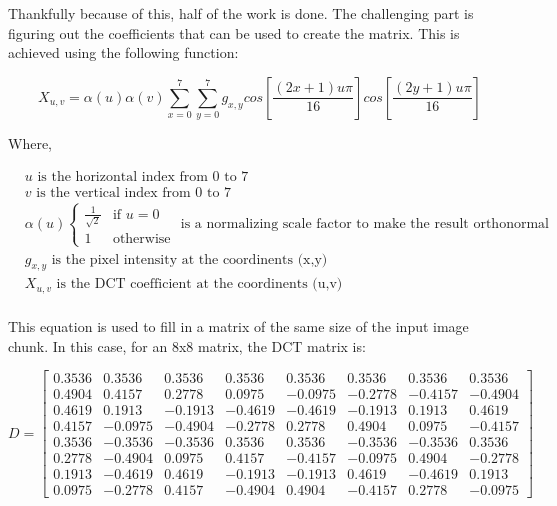 \documentclass[11pt]{article}
\begin{document}
Thankfully because of this, half of the work is done.
The challenging part is figuring out the coefficients that can be used to create the matrix.
This is achieved using the following function:

\begin{equation}
  \label{eqn:dct}
  X_{u,v} = \alpha(u) \alpha(v) \sum_{x=0}^{7} \sum_{y=0}^{7} g_{x,y} cos \left [  \frac{(2x+1)u\pi}{16} \right ] cos \left [  \frac{(2y+1)u\pi}{16} \right ]
\end{equation}

Where,

\begin{align*}
  &u \text{ is the horizontal index from 0 to 7} \\
  &v \text{ is the vertical index from 0 to 7} \\
  &\alpha(u) \left\{\begin{matrix}
    \frac{1}{\sqrt{2}} & \text{if } u=0 \\ 
    1 &  \text{otherwise}
  \end{matrix}\right. \text{ is a normalizing scale factor to make the result orthonormal} \\
  &g_{x,y} \text{ is the pixel intensity at the coordinents (x,y)} \\
  &X_{u,v} \text{ is the DCT coefficient at the coordinents (u,v)} \\
\end{align*}

This equation is used to fill in a matrix of the same size of the input image chunk.
In this case, for an 8x8 matrix, the DCT matrix is:

\begin{equation}
  \label{eqn:dctMatrix}
  D = \begin{bmatrix}
    0.3536 & 0.3536 & 0.3536 & 0.3536 & 0.3536 & 0.3536 & 0.3536 & 0.3536 \\
    0.4904 & 0.4157 & 0.2778 & 0.0975 &-0.0975 &-0.2778 &-0.4157 &-0.4904 \\
    0.4619 & 0.1913 &-0.1913 &-0.4619 &-0.4619 &-0.1913 & 0.1913 & 0.4619 \\
    0.4157 &-0.0975 &-0.4904 &-0.2778 & 0.2778 & 0.4904 & 0.0975 &-0.4157 \\
    0.3536 &-0.3536 &-0.3536 & 0.3536 & 0.3536 &-0.3536 &-0.3536 & 0.3536 \\
    0.2778 &-0.4904 & 0.0975 & 0.4157 &-0.4157 &-0.0975 & 0.4904 &-0.2778 \\
    0.1913 &-0.4619 & 0.4619 &-0.1913 &-0.1913 & 0.4619 &-0.4619 & 0.1913 \\
    0.0975 &-0.2778 & 0.4157 &-0.4904 & 0.4904 &-0.4157 & 0.2778 &-0.0975
  \end{bmatrix}
\end{equation}
\end{document}
